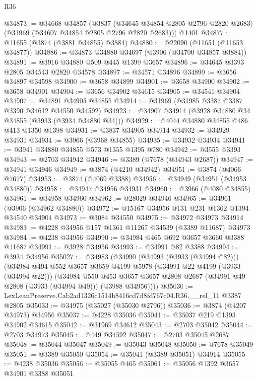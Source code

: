 \begin{lexlean}{R36}
\begin{coremodule}
@34873 := @34668
    @34857
    (@3837 (@34645 @34854 @2805 @2796 @2820 @2683) (@31969 (@34607 @34854 @2805 @2796 @2820 @2683)))
    @1401
@34877 := @11655 (@3874 (@3881 @34855) @3884)
@34880 := @22090 (@11651 (@11653 @34877))
@34886 := @34873 @34880 @34697 (@3906 (@34700 @34857 @3884))
@34891 := @3916 @34880 @509 @445 @1399 @3657
@34896 := @34645 @3393 @2805 @34543 @2820 @34578
@34897 := @34571 @34896
@34899 := @3656 @34897 @34598
@34900 := @3658 @34899
@34901 := @3658 @34900
@34902 := @3658 @34901
@34904 := @3656 @34902 @34615
@34905 := @34541 @34904
@34907 := @34891 @34905 @34855
@34914 := @31969 (@31985 @3387 @3387 @3390 @34612 @34550 @34592)
@34923 := @34907 @34914 (@3928 @34880 @34 @34855 (@3933 (@3934 @34880 @34)))
@34929 := @4044 @34880 @34855 @486 @413 @1350 @1398
@34931 := @3837 @34905 @34914
@34932 := @34929 @34931
@34934 := @3966 (@3968 @34855)
@34935 := @34932 @34934
@34941 := @3941 @34880 @34855 @573 @1355 @1395 @780
@34942 := @3555 @3393
@34943 := @2703 @34942
@34946 := @3389 (@7678 (@34943 @2687))
@34947 := @34941 @34946
@34949 := @3874 (@4210 @34942)
@34951 := @3874 (@4066 @7677)
@34953 := @3874 (@4069 @3388)
@34956 := @34949 (@34951 (@34953 @34880))
@34958 := @34947 @34956 @34931
@34960 := @3966 (@4080 @34855)
@34961 := @34958 @34960
@34962 := @28029 @34946
@34965 := @34961 (@3906 (@34962 @34880))
@34972 := @15167 @34956 @131 @231 @1362 @1394 @34540 @34904
@34973 := @3084 @34550
@34975 := @34972 @34973 @34914
@34983 := @4228 @34956 @157 @1361 @11267 @34539 (@3389 @11687) @34973
@34984 := @4238 @34956
@34990 := @34984 @465 @692 @3657 @3660 @3388 @11687
@34991 := @3928 @34956
@34993 := @34991 @82 @3388
@34994 := @3934 @34956
@35027 := @34983
    (@34990
      (@34993 (@3933 (@34994 @82)))
      (@34984
        @494
        @552
        @3657
        @3659
        @4199
        @5978
        (@34991 @22 @4199 (@3933 (@34994 @22)))
        (@34984
          @550
          @453
          @3657
          @3657
          @2808
          @2687
          (@34991 @49 @2808 (@3933 (@34994 @49)))
          (@3988 @34956))))
@35030 := LexLeanPreserve.Cab2ad1326c1514b8416cd7d8fd767c04.R36.__rel_11 @3387 @2805
@35033 := @34975 (@35027 (@35030 @2796))
@35036 := @3874 (@4207 @34973) @34956
@35037 := @4228 @35036
@35041 := @35037 @219 @1393 @34902 @34615
@35042 := @31969 @34612
@35043 := @2703 @35042
@35044 := @2703 @34973
@35045 := @449 @34592
@35047 := @2703 @35045 @2687
@35048 := @35044 @35047
@35049 := @35043 @35048
@35050 := @7678 @35049
@35051 := @3389 @35050
@35054 := @35041 (@3389 @35051) @34914
@35055 := @4238 @35036
@35056 := @35055 @465
@35061 := @35056 @1392 @3657 @34901 @3388 @35051

\end{coremodule}
\end{lexlean}
